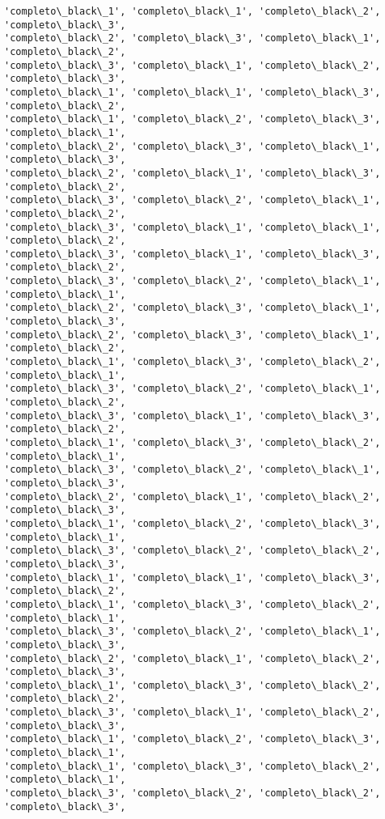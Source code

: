 \documentclass[11pt]{article}
\begin{document}
\begin{Verbatim}[commandchars=\\\{\}]
'completo\_black\_1', 'completo\_black\_1', 'completo\_black\_2', 'completo\_black\_3',
'completo\_black\_2', 'completo\_black\_3', 'completo\_black\_1', 'completo\_black\_2',
'completo\_black\_3', 'completo\_black\_1', 'completo\_black\_2', 'completo\_black\_3',
'completo\_black\_1', 'completo\_black\_1', 'completo\_black\_3', 'completo\_black\_2',
'completo\_black\_1', 'completo\_black\_2', 'completo\_black\_3', 'completo\_black\_1',
'completo\_black\_2', 'completo\_black\_3', 'completo\_black\_1', 'completo\_black\_3',
'completo\_black\_2', 'completo\_black\_1', 'completo\_black\_3', 'completo\_black\_2',
'completo\_black\_3', 'completo\_black\_2', 'completo\_black\_1', 'completo\_black\_2',
'completo\_black\_3', 'completo\_black\_1', 'completo\_black\_1', 'completo\_black\_2',
'completo\_black\_3', 'completo\_black\_1', 'completo\_black\_3', 'completo\_black\_2',
'completo\_black\_3', 'completo\_black\_2', 'completo\_black\_1', 'completo\_black\_1',
'completo\_black\_2', 'completo\_black\_3', 'completo\_black\_1', 'completo\_black\_3',
'completo\_black\_2', 'completo\_black\_3', 'completo\_black\_1', 'completo\_black\_2',
'completo\_black\_1', 'completo\_black\_3', 'completo\_black\_2', 'completo\_black\_1',
'completo\_black\_3', 'completo\_black\_2', 'completo\_black\_1', 'completo\_black\_2',
'completo\_black\_3', 'completo\_black\_1', 'completo\_black\_3', 'completo\_black\_2',
'completo\_black\_1', 'completo\_black\_3', 'completo\_black\_2', 'completo\_black\_1',
'completo\_black\_3', 'completo\_black\_2', 'completo\_black\_1', 'completo\_black\_3',
'completo\_black\_2', 'completo\_black\_1', 'completo\_black\_2', 'completo\_black\_3',
'completo\_black\_1', 'completo\_black\_2', 'completo\_black\_3', 'completo\_black\_1',
'completo\_black\_3', 'completo\_black\_2', 'completo\_black\_2', 'completo\_black\_3',
'completo\_black\_1', 'completo\_black\_1', 'completo\_black\_3', 'completo\_black\_2',
'completo\_black\_1', 'completo\_black\_3', 'completo\_black\_2', 'completo\_black\_1',
'completo\_black\_3', 'completo\_black\_2', 'completo\_black\_1', 'completo\_black\_3',
'completo\_black\_2', 'completo\_black\_1', 'completo\_black\_2', 'completo\_black\_3',
'completo\_black\_1', 'completo\_black\_3', 'completo\_black\_2', 'completo\_black\_2',
'completo\_black\_3', 'completo\_black\_1', 'completo\_black\_2', 'completo\_black\_3',
'completo\_black\_1', 'completo\_black\_2', 'completo\_black\_3', 'completo\_black\_1',
'completo\_black\_1', 'completo\_black\_3', 'completo\_black\_2', 'completo\_black\_1',
'completo\_black\_3', 'completo\_black\_2', 'completo\_black\_2', 'completo\_black\_3',

\end{Verbatim}
\end{document}

